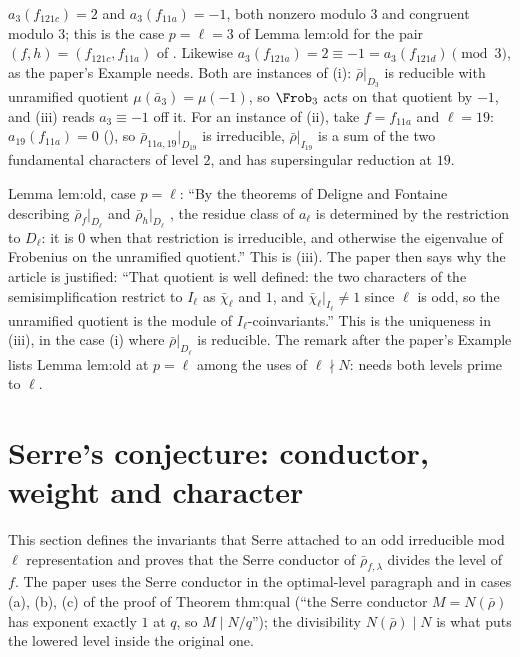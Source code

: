 \begin{example}\label{ex:modgalrep:deligne-fontaine}
$a_3(f_{121c})=2$ and $a_3(f_{11a})=-1$, both nonzero modulo $3$ and congruent modulo $3$; this is the case $p=\ell=3$ of Lemma lem:old for the pair
$(f,h)=(f_{121c},f_{11a})$ of . Likewise $a_3(f_{121a})=2\equiv-1=a_3(f_{121d})\pmod3$, as the paper's Example needs.
Both are instances of (i): $\bar\rho|_{D_3}$ is reducible with unramified quotient $\mu(\bar a_3)=\mu(-1)$, so $\Frob_3$ acts on that quotient by $-1$, and (iii) reads $a_3\equiv-1$ off it.
For an instance of (ii), take $f=f_{11a}$ and $\ell=19$: $a_{19}(f_{11a})=0$ (), so $\bar\rho_{11a,19}|_{D_{19}}$ is irreducible, $\bar\rho|_{I_{19}}$ is a sum of the two
fundamental characters of level $2$, and  has supersingular reduction at $19$.
\end{example}

\begin{paperlink}
Lemma lem:old, case $p=\ell$: ``By the theorems of Deligne and Fontaine describing $\bar\rho_f|_{D_\ell}$ and $\bar\rho_h|_{D_\ell}$ \cite[\S2]{Edixhoven92}, the residue
class of $a_\ell$ is determined by the restriction to $D_\ell$: it is $0$ when that restriction is irreducible, and otherwise the eigenvalue of Frobenius on
the unramified quotient.'' This is (iii). The paper then says why the article is justified: ``That quotient is well
defined: the two characters of the semisimplification restrict to $I_\ell$ as $\bar\chi_\ell$ and $1$, and $\bar\chi_\ell|_{I_\ell}\ne1$ since $\ell$ is odd, so the
unramified quotient is the module of $I_\ell$-coinvariants.'' This is the uniqueness in (iii), in the case (i) where
$\bar\rho|_{D_\ell}$ is reducible. The remark after the paper's Example lists Lemma lem:old at $p=\ell$ among the uses of $\ell\nmid N$: 
needs both levels prime to $\ell$.
\end{paperlink}

\section[Serre's conjecture]{Serre's conjecture: conductor, weight and character}\label{sec:modgalrep:serre}

This section defines the invariants that Serre attached to an odd irreducible mod $\ell$ representation and proves that the Serre conductor of
$\bar\rho_{f,\lambda}$ divides the level of $f$. The paper uses the Serre conductor in the optimal-level paragraph and in cases (a), (b), (c) of the proof
of Theorem thm:qual (``the Serre conductor $M=N(\bar\rho)$ has exponent exactly $1$ at $q$, so $M\mid N/q$''); the divisibility $N(\bar\rho)\mid N$ is what puts the
lowered level inside the original one.

